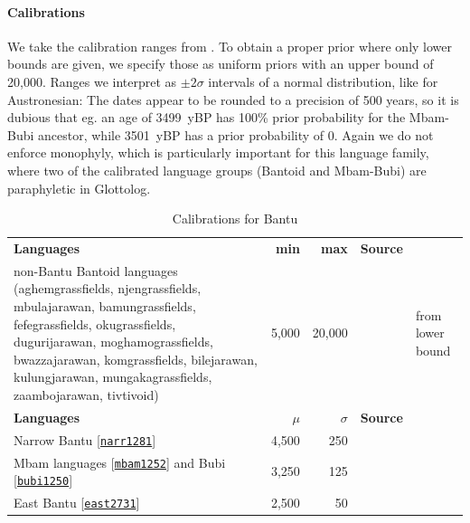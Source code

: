 \documentclass[]{rsos}%
\newcommand{\glot}[2]{#1 {\scriptsize{[\texttt{\href{https://glottolog.org/resource/languoid/id/#2}{#2}}]}}}
\begin{document}
\paragraph{Calibrations}
We take the calibration ranges from \textcite{grollemund2015bantu}.
To obtain a proper prior where only lower bounds are given, we specify those as uniform priors with an upper bound of 20,000. Ranges we interpret as $\pm 2\sigma$ intervals of a normal distribution, like for Austronesian:
The dates appear to be rounded to a precision of 500 years, so it is dubious that eg. an age of 3499~yBP has 100\% prior probability for the Mbam-Bubi ancestor, while 3501~yBP has a prior probability of 0.
Again we do not enforce monophyly, which is particularly important for this language family, where two of the calibrated language groups (Bantoid and Mbam-Bubi) are paraphyletic in Glottolog.
\begin{table}
    \centering
    \begin{tabular}{p{7cm}rrcl}
\textbf{Languages} & \textbf{min} & \textbf{max} & \textbf{Source}\\
non-Bantu Bantoid languages (aghemgrassfields, njengrassfields, mbulajarawan, bamungrassfields, fefegrassfields, okugrassfields, dugurijarawan, moghamograssfields, bwazzajarawan, komgrassfields, bilejarawan, kulungjarawan, mungakagrassfields, zaambojarawan, tivtivoid)& 5,000 & 20,000 & \parencite{grollemund2015bantu} & from lower bound\\
\textbf{Languages} & \textbf{$\mu$} & \textbf{$\sigma$} & \textbf{Source}\\
\glot{Narrow Bantu}{narr1281} & 4,500 & 250 & \parencite{grollemund2015bantu} \\
\glot{Mbam languages}{mbam1252} and \glot{Bubi}{bubi1250} & 3,250 & 125 & \parencite{grollemund2015bantu} \\
\glot{East Bantu}{east2731} & 2,500 & 50 & \parencite{grollemund2015bantu}
    \end{tabular}
    \caption{Calibrations for Bantu}
    \label{t:austronesian}
\end{table}
\end{document}

